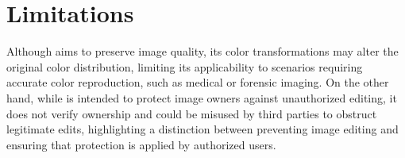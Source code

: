 \section{Limitations}
\label{sec:discussion}
Although \capg{} aims to preserve image quality, its color transformations may alter the original color distribution, limiting its applicability to scenarios requiring accurate color reproduction, such as medical or forensic imaging. On the other hand, while \capg{} is intended to protect image owners against unauthorized editing, it does not verify ownership and could be misused by third parties to obstruct legitimate edits, highlighting a distinction between preventing image editing and ensuring that protection is applied by authorized users.

